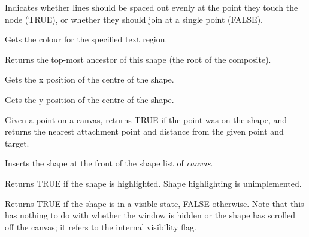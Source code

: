 

Indicates whether lines should be spaced out evenly at the point they touch the node (TRUE), or whether they
should join at a single point (FALSE).



Gets the colour for the specified text region.



Returns the top-most ancestor of this shape (the root of the composite).



Gets the x position of the centre of the shape.



Gets the y position of the centre of the shape.



Given a point on a canvas, returns TRUE if the point was on the shape, and returns
the nearest attachment point and distance from the given point and target.



Inserts the shape at the front of the shape list of {\it canvas}.



Returns TRUE if the shape is highlighted. Shape highlighting is unimplemented.



Returns TRUE if the shape is in a visible state, FALSE otherwise. Note
that this has nothing to do with whether the window is hidden or the
shape has scrolled off the canvas; it refers to the internal
visibility flag.


